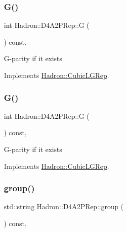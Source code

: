 \subsubsection{\texorpdfstring{G()}{G()}\hspace{0.1cm}{\footnotesize\ttfamily [2/3]}}
{\footnotesize\ttfamily int Hadron\+::\+D4\+A2\+P\+Rep\+::G (\begin{DoxyParamCaption}{ }\end{DoxyParamCaption}) const\hspace{0.3cm}{\ttfamily [inline]}, {\ttfamily [virtual]}}

G-\/parity if it exists 

Implements \mbox{\hyperlink{structHadron_1_1CubicLGRep_ace26f7b2d55e3a668a14cb9026da5231}{Hadron\+::\+Cubic\+L\+G\+Rep}}.

\mbox{\label{structHadron_1_1D4A2PRep_a9f96095822166d1ed6380bbeacb21938}} 
\subsubsection{\texorpdfstring{G()}{G()}\hspace{0.1cm}{\footnotesize\ttfamily [3/3]}}
{\footnotesize\ttfamily int Hadron\+::\+D4\+A2\+P\+Rep\+::G (\begin{DoxyParamCaption}{ }\end{DoxyParamCaption}) const\hspace{0.3cm}{\ttfamily [inline]}, {\ttfamily [virtual]}}

G-\/parity if it exists 

Implements \mbox{\hyperlink{structHadron_1_1CubicLGRep_ace26f7b2d55e3a668a14cb9026da5231}{Hadron\+::\+Cubic\+L\+G\+Rep}}.

\mbox{\label{structHadron_1_1D4A2PRep_aec02eb83b025cab9d6a38554361f3f90}} 
\subsubsection{\texorpdfstring{group()}{group()}\hspace{0.1cm}{\footnotesize\ttfamily [1/3]}}
{\footnotesize\ttfamily std\+::string Hadron\+::\+D4\+A2\+P\+Rep\+::group (\begin{DoxyParamCaption}{ }\end{DoxyParamCaption}) const\hspace{0.3cm}{\ttfamily [inline]}, {\ttfamily [virtual]}}

